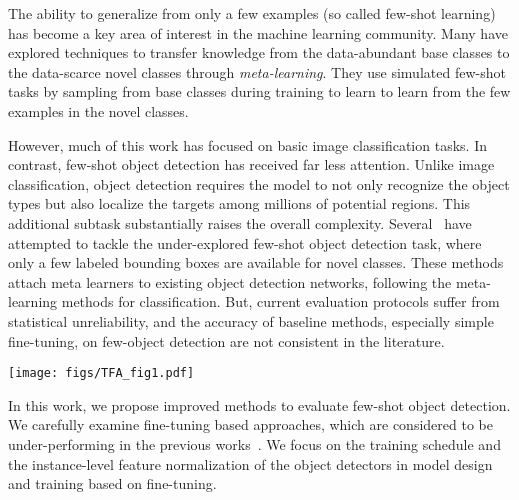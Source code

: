\documentclass{article}
\newcommand{\model}{TFA\xspace}
\begin{document}
The ability to generalize from only a few examples (so called few-shot learning) has become a key area of interest in the machine learning community.
Many \cite{vinyals2016matching,snell2017prototypical,finn2017model,hariharan2017low,gidaris2018dynamic,wang2019tafe} have explored techniques to transfer knowledge from the data-abundant base classes to the data-scarce novel classes through \emph{meta-learning}. 
They use simulated few-shot tasks by sampling from base classes during training to learn to learn from the few examples in the novel classes.

However, much of this work has focused on basic image classification tasks. 
In contrast, few-shot object detection has received far less attention. 
Unlike image classification, object detection requires the model to not only recognize the object types but also localize the targets among millions of potential regions. This additional subtask substantially
raises the overall complexity. Several~\cite{kang2019few,yan2019meta,wang2019meta} have attempted to tackle the under-explored few-shot object detection task, where only a few labeled bounding boxes are available for novel classes. These methods attach meta learners to existing object detection networks, following the meta-learning methods for classification. But, current evaluation protocols suffer from statistical unreliability, and the accuracy of baseline methods, especially simple fine-tuning, on few-object detection are not consistent in the literature.




\begin{figure*}[ht]
    \centering
    \texttt{[image: figs/TFA\_fig1.pdf]}
    \vspace{-1cm}
    \caption{Illustration of our two-stage fine-tuning approach (\model). In the base training stage, the entire object detector, including both the feature extractor $\mathcal{F}$ and the box predictor, are jointly trained on the base classes. In the few-shot fine-tuning stage, the feature extractor components are fixed and only the box predictor is fine-tuned on a balanced subset consisting of both the base and novel classes.}
    \label{fig:tfa_arch}
\end{figure*}

In this work, we propose improved methods to evaluate few-shot object detection. We carefully examine fine-tuning based approaches, which are 
considered to be under-performing in the previous works~\cite{kang2019few,yan2019meta,wang2019meta}.
We focus on the training schedule and the instance-level feature normalization of the object detectors in model design and training based on fine-tuning.
\end{document}

